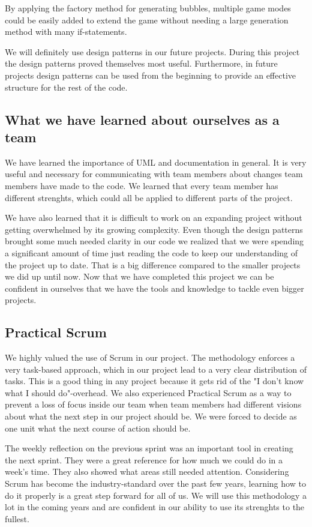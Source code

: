 \documentclass[a4paper]{article}
\begin{document}
By applying the factory method for generating bubbles, multiple game modes could be easily added to extend the game without needing a large generation method with many if-statements.

We will definitely use design patterns in our future projects. During this project the design patterns proved themselves most useful. Furthermore, in future projects design patterns can be used from the beginning to provide an effective structure for the rest of the code.

\subsection{What we have learned about ourselves as a team}
We have learned the importance of UML and documentation in general. It is very useful and necessary for communicating with team members about changes team members have made to the code. We learned that every team member has different strenghts, which could all be applied to different parts of the project. 

We have also learned that it is difficult to work on an expanding project without getting overwhelmed by its growing complexity. Even though the design patterns brought some much needed clarity in our code we realized that we were spending a significant amount of time just reading the code to keep our understanding of the project up to date. That is a big difference compared to the smaller projects we did up until now. Now that we have completed this project we can be confident in ourselves that we have the tools and knowledge to tackle even bigger projects.

\subsection{Practical Scrum}
We highly valued the use of Scrum in our project. The methodology enforces a very task-based approach, which in our project lead to a very clear distribution of tasks. This is a good thing in any project because it gets rid of the "I don't know what I should do"-overhead. We also experienced Practical Scrum as a way to prevent a loss of focus inside our team when team members had different visions about what the next step in our project should be. We were forced to decide as one unit what the next course of action should be.

The weekly reflection on the previous sprint was an important tool in creating the next sprint. They were a great reference for how much we could do in a week's time. They also showed what areas still needed attention. Considering Scrum has become the industry-standard over the past few years, learning how to do it properly is a great step forward for all of us. We will use this methodology a lot in the coming years and are confident in our ability to use its strenghts to the fullest.
\end{document}
